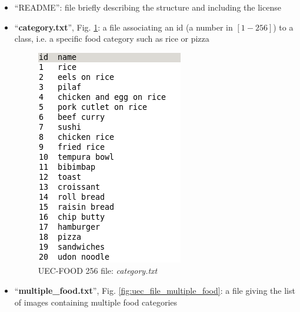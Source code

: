\begin{itemize}
    \item \enquote{README}: file briefly describing the structure and including the license
    
    \item \enquote{\textbf{category.txt}}, Fig. \ref{fig:uec_file_category}: a file associating an id (a number in $[1 - 256]$) to a class, i.e. a specific food category such as rice or pizza
    
    \begin{figure}[h]
        \centering
        \includegraphics[scale=0.5]{img/uec_file_category.png}
        \caption[UEC-FOOD 256 file: \textit{category.txt}]{UEC-FOOD 256 file: \textit{category.txt}}
        \label{fig:uec_file_category}
    \end{figure}
    
    \item \enquote{\textbf{multiple\_food.txt}}, Fig. \ref{fig:uec_file_multiple_food}: a file giving the list of images containing multiple food categories
    

\end{itemize}
